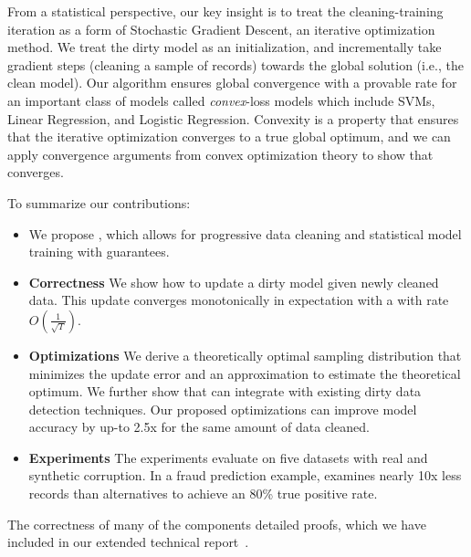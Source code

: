 From a statistical perspective, our key insight is to treat the cleaning-training iteration as a form of Stochastic Gradient Descent, an iterative optimization method.
We treat the dirty model as an initialization, and incrementally take gradient steps (cleaning a sample of records) towards the global solution (i.e., the clean model).
Our algorithm ensures global convergence with a provable rate for an important class of models called \emph{convex}-loss models which include SVMs, Linear Regression, and Logistic Regression.
Convexity is a property that ensures that the iterative optimization converges to a true global optimum, and we can apply convergence arguments from convex optimization theory to show that \sys converges.

To summarize our contributions:
\begin{itemize}[noitemsep]
\item We propose \sys, which allows for progressive data cleaning and statistical model training with guarantees.
\item \textbf{Correctness} We show how to update a dirty model given newly cleaned data. This update converges monotonically in expectation with a with rate $O(\frac{1}{\sqrt{T}})$.
\item \textbf{Optimizations} We derive a theoretically optimal sampling distribution that minimizes the update error and an approximation to estimate the theoretical optimum. We further show that \sys can integrate with existing dirty data detection techniques. Our proposed optimizations can improve model accuracy by up-to 2.5x for the same amount of data cleaned.
\item \textbf{Experiments} The experiments evaluate \sys on five datasets with real and synthetic corruption. In a fraud prediction example, \sys examines nearly 10x less records than alternatives to achieve an 80\% true positive rate.
\end{itemize}
The correctness of many of the components detailed proofs, which we have included in our extended technical report~\cite{activecleanarxiv}.





